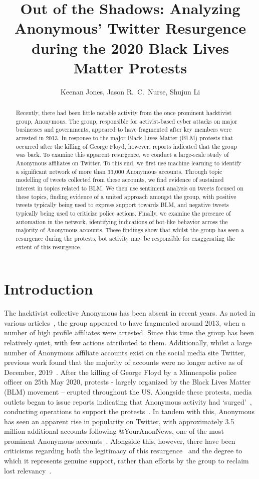 \documentclass[letterpaper]{article}
\title{Out of the Shadows: Analyzing Anonymous' Twitter Resurgence during the 2020 Black Lives Matter Protests}
\author{Keenan Jones, Jason R.~C.~Nurse, Shujun Li\\}
\begin{document}
\maketitle

\begin{abstract}
Recently, there had been little notable activity from the once prominent hacktivist group, Anonymous. The group, responsible for activist-based cyber attacks on major businesses and governments, appeared to have fragmented after key members were arrested in 2013. In response to the major Black Lives Matter (BLM) protests that occurred after the killing of George Floyd, however, reports indicated that the group was back. To examine this apparent resurgence, we conduct a large-scale study of Anonymous affiliates on Twitter. To this end, we first use machine learning to identify a significant network of more than 33,000 Anonymous accounts. Through topic modelling of tweets collected from these accounts, we find evidence of sustained interest in topics related to BLM. We then use sentiment analysis on tweets focused on these topics, finding evidence of a united approach amongst the group, with positive tweets typically being used to express support towards BLM, and negative tweets typically being used to criticize police actions. Finally, we examine the presence of automation in the network, identifying indications of bot-like behavior across the majority of Anonymous accounts. These findings show that whilst the group has seen a resurgence during the protests, bot activity may be responsible for exaggerating the extent of this resurgence.
\end{abstract}

\section{Introduction}

The hacktivist collective Anonymous has been absent in recent years. As noted in various articles~\cite{Uitermark2017}, the group appeared to have fragmented around 2013, when a number of high profile affiliates were arrested. Since this time the group has been relatively quiet, with few actions attributed to them. Additionally, whilst a large number of Anonymous affiliate accounts exist on the social media site Twitter, previous work found that the majority of accounts were no longer active as of December, 2019~\cite{Jones2020}.
After the killing of George Floyd by a Minneapolis police officer on 25th May 2020, protests - largely organized by the Black Lives Matter (BLM) movement -- erupted throughout the US. Alongside these protests, media outlets began to issue reports indicating that Anonymous activity had `surged'~\cite{Independant2020}, conducting operations to support the protests~\cite{AJC2020}. In tandem with this, Anonymous has seen an apparent rise in popularity on Twitter, with approximately 3.5 million additional accounts following @YourAnonNews, one of the most prominent Anonymous accounts~\cite{Independant2020}. Alongside this, however, there have been criticisms regarding both the legitimacy of this resurgence~\cite{Independant2020} and the degree to which it represents genuine support, rather than efforts by the group to reclaim lost relevancy~\cite{Telegraph2020}.
\end{document}
